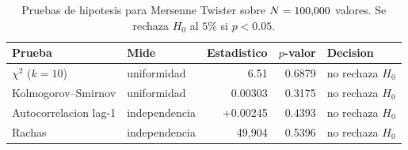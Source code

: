 \begin{table}[htbp]\centering
\caption{Pruebas de hipotesis para Mersenne Twister sobre $N=100{,}000$ valores. Se rechaza $H_0$ al $5\%$ si $p<0.05$.}
\label{tab:pruebasMT}
\small
\begin{tabular}{l|l|r|r|l}
\toprule
Prueba & Mide & Estadistico & $p$-valor & Decision \\
\midrule
$\chi^2$ ($k=10$) & uniformidad & 6.51 & 0.6879 & no rechaza $H_0$ \\
Kolmogorov--Smirnov & uniformidad & 0.00303 & 0.3175 & no rechaza $H_0$ \\
Autocorrelacion lag-1 & independencia & +0.00245 & 0.4393 & no rechaza $H_0$ \\
Rachas & independencia & 49{,}904 & 0.5396 & no rechaza $H_0$ \\
\bottomrule
\end{tabular}
\end{table}
